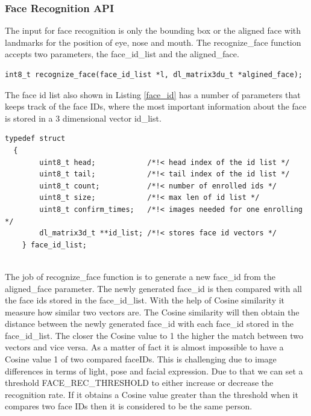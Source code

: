 \subsubsection{Face Recognition API} 

The input for face recognition is only the bounding box or the aligned face with landmarks for the position of eye, nose and mouth. The {\selectfont recognize\_face} function accepts two parameters, the {\selectfont face\_id\_list} and the {\selectfont aligned\_face}.
\begin{lstlisting}[caption={Face Recognition API},label=face_rec, captionpos=b]
int8_t recognize_face(face_id_list *l, dl_matrix3du_t *algined_face);
\end{lstlisting}

The face id list also shown in Listing \ref{face_id} has a number of parameters that keeps track of the face IDs, where the most important information about the face is stored in a 3 dimensional vector {\selectfont id\_list}. 





\begin{lstlisting}[caption={Face Id List \cite{espwho}. },label=face_id, captionpos=b]
typedef struct
  {
        uint8_t head;            /*!< head index of the id list */
        uint8_t tail;            /*!< tail index of the id list */
        uint8_t count;           /*!< number of enrolled ids */
        uint8_t size;            /*!< max len of id list */
        uint8_t confirm_times;   /*!< images needed for one enrolling */
        dl_matrix3d_t **id_list; /*!< stores face id vectors */
    } face_id_list;
    
    \end{lstlisting}

The job of {\selectfont recognize\_face} function is to generate a new {\selectfont face\_id} from the {\selectfont aligned\_face} parameter. The newly generated {\selectfont face\_id} is then compared with all the face ids stored in the {\selectfont face\_id\_list}. With the help of Cosine similarity it measure how similar two vectors are. The Cosine similarity will then obtain the distance between the newly generated {\selectfont face\_id} with each {\selectfont face\_id} stored in the {\selectfont face\_id\_list}. The closer the Cosine value to 1 the higher the match between two vectors and vice versa. As a matter of fact it is almost impossible to have a Cosine value 1 of two compared faceIDs. This is challenging due to image differences in terms of light, pose and facial expression. Due to that we can set a threshold {\selectfont FACE\_REC\_THRESHOLD}  to either increase or decrease the recognition rate. If it obtains a Cosine value greater than the threshold when it compares two face IDs then it is considered to be the same person. 

